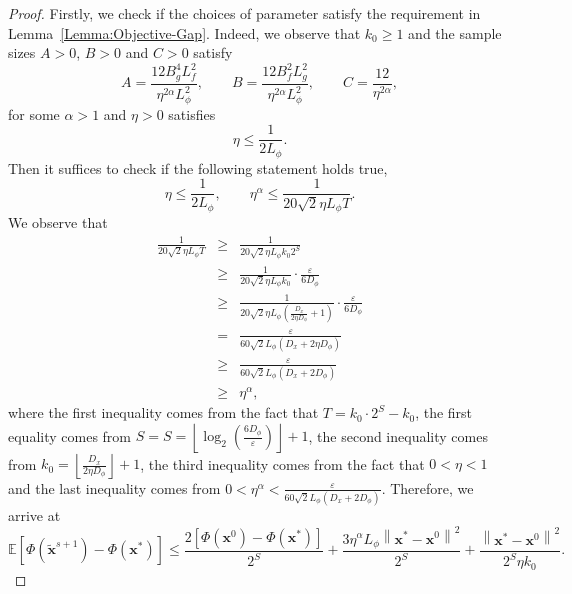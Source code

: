 \documentclass[11pt]{article}
\newcommand{\BE}{\mathbb{E}}
\newcommand{\x}{\mathbf x}
\begin{document}
\begin{proof}
Firstly, we check if the choices of parameter satisfy the requirement in Lemma~\ref{Lemma:Objective-Gap}. Indeed, we observe that $k_0\geq 1$ and the sample sizes $A>0$, $B>0$ and $C>0$ satisfy 
\begin{equation*}
A = \frac{12 B_g^4 L_f^2}{\eta^{2\alpha}L_\phi^2}, \qquad B = \frac{12 B_f^2 L_g^2}{\eta^{2\alpha}L_\phi^2},  \qquad C = \frac{12}{\eta^{2\alpha}},
\end{equation*}
for some $\alpha>1$ and $\eta>0$ satisfies 
\begin{equation*}
\eta \leq \frac{1}{2 L_\phi}.  
\end{equation*}
Then it suffices to check if the following statement holds true, 
\begin{equation*}
\eta \leq \frac{1}{2 L_\phi}, \qquad \eta^{\alpha} \leq \frac{1}{20\sqrt{2}\eta L_\phi T}. 
\end{equation*} 
We observe that 
\begin{eqnarray*}
\frac{1}{20\sqrt{2}\eta L_\phi T} & \geq & \frac{1}{20\sqrt{2}\eta L_\phi k_0 2^S} \\
& \geq & \frac{1}{20\sqrt{2} \eta L_\phi k_0} \cdot \frac{\varepsilon}{6D_\phi} \\
& \geq & \frac{1}{20\sqrt{2} \eta L_\phi \left(\frac{D_x}{2 \eta D_\phi}+1\right)}\cdot\frac{\varepsilon}{6D_\phi} \\
& = & \frac{\varepsilon}{60\sqrt{2} L_\phi\left(D_x + 2\eta D_\phi\right)} \\
& \geq & \frac{\varepsilon}{60\sqrt{2} L_\phi\left(D_x + 2D_\phi\right)} \\
& \geq & \eta^{\alpha},  
\end{eqnarray*}
where the first inequality comes from the fact that $T=k_0 \cdot 2^S-k_0$, the first equality comes from $S = S = \left\lfloor\log_2\left(\frac{6D_\phi}{\varepsilon}\right) \right\rfloor + 1$, the second inequality comes from $k_0 = \left\lfloor \frac{D_x}{2 \eta D_\phi} \right\rfloor + 1$, the third inequality comes from the fact that $0 < \eta < 1$ and the last inequality comes from $0<\eta^\alpha<\frac{\varepsilon}{60\sqrt{2} L_\phi\left(D_x + 2D_\phi\right)}$. Therefore, we arrive at
\begin{equation*}
\BE\left[\Phi(\tilde{\x}^{s+1}) - \Phi(\x^*)\right] \leq \frac{2\left[\Phi(\x^0)-\Phi(\x^*)\right]}{2^S} + \frac{3 \eta^\alpha L_\phi \left\| \x^* - \x^0 \right\|^2}{2^S} + \frac{\left\| \x^* - \x^0 \right\|^2}{2^S\eta k_0}. 
\end{equation*}

\end{proof}
\end{document}
